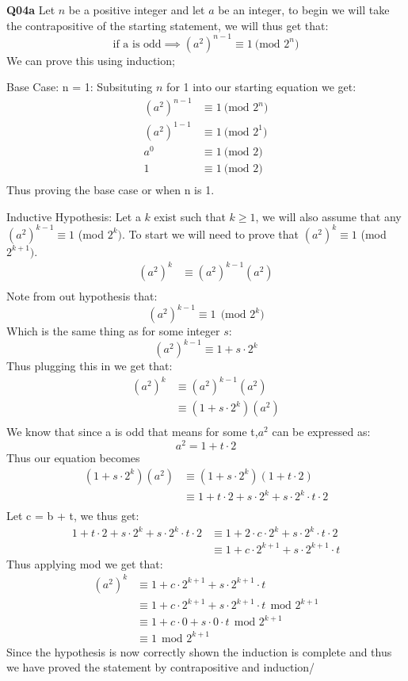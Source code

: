 \documentclass[11pt]{article}
\begin{document}
\parindent=0pt

\textbf{Q04a} Let $n$ be a positive integer and let $a$ be an integer, to begin we will take the contrapositive of the starting statement, we will thus get that:
\[ \text{if a is odd} \implies (a^2)^{n-1} \equiv 1 \ \text{(mod $2^n$)} \]
We can prove this using induction;

Base Case: n = 1:
Subsituting $n$ for 1 into our starting equation we get:
\begin{align*}
 (a^2)^{n-1} & \equiv 1 \ \text{(mod $2^n$)} \\
 (a^2)^{1-1} & \equiv 1 \ \text{(mod $2^1$)} \\
 a^0 & \equiv 1 \ \text{(mod 2)} \\
 1 & \equiv 1 \ \text{(mod 2)} \\
\end{align*}
Thus proving the base case or when n is 1.

Inductive Hypothesis: Let a $k$ exist such that $k \geq 1$, we will also assume that any $(a^2)^{k-1} \equiv 1$ (mod $2^k)$. To start we will need to prove that $(a^2)^{k} \equiv 1$ (mod $2^{k+1})$.\\
\begin{align*}
 (a^2)^{k} & \equiv  (a^2)^{k-1}(a^2)\\
\end{align*}
Note from out hypothesis that:
\[ (a^2)^{k-1} \equiv 1 \ \ \text{(mod $2^k$)}  \]
Which is the same thing as for some integer $s$:
\[ (a^2)^{k-1} \equiv 1 +  s\cdot2^k\]
Thus plugging this in we get that:
\begin{align*}
 (a^2)^{k} & \equiv  (a^2)^{k-1}(a^2)\\
& \equiv  (1 +  s\cdot 2^k) (a^2)\\
\end{align*}
We know that since a is odd that means for some t,$ a^2$ can be expressed as:
\[ a^2 = 1 + t\cdot2 \]
Thus our equation becomes 
\begin{align*}
(1 +  s\cdot 2^k) (a^2) & \equiv (1 +  s\cdot 2^k) (1+t\cdot2)  \\
& \equiv  1 +  t\cdot 2 + s\cdot 2^k + s\cdot 2^k \cdot t \cdot2  \\
\end{align*}
Let c = b + t, we thus get:
\begin{align*}
1 +  t\cdot 2 + s\cdot 2^k + s\cdot 2^k \cdot t \cdot2  & \equiv   1 +   2\cdot c \cdot 2^k + s\cdot 2^k \cdot t \cdot2 \\
 & \equiv 1 +   c \cdot 2^{k+1} + s\cdot 2^{k+1} \cdot t 
\end{align*}
Thus applying mod we get that:
\begin{align*}
 (a^2)^{k} & \equiv 1 +   c \cdot 2^{k+1} + s\cdot 2^{k+1} \cdot t \\
& \equiv 1 +   c \cdot 2^{k+1} + s\cdot 2^{k+1} \cdot t \ \ \text{mod $2^{k+1}$} \\
& \equiv 1 +   c \cdot 0+ s\cdot0 \cdot t \ \ \text{mod $2^{k+1}$} \\
& \equiv 1 \ \ \text{mod $2^{k+1}$}
\end{align*}
Since the hypothesis is now correctly shown the induction is complete and thus we have proved the statement by contrapositive and induction/
\end{document}
